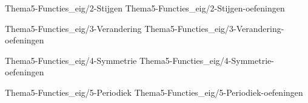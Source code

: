   \FVDchapterpair
  {Thema5-Functies_eig/2-Stijgen}
  {Thema5-Functies_eig/2-Stijgen-oefeningen}
  
  \FVDchapterpair
  {Thema5-Functies_eig/3-Verandering}
  {Thema5-Functies_eig/3-Verandering-oefeningen}
  
  \FVDchapterpair
  {Thema5-Functies_eig/4-Symmetrie}
  {Thema5-Functies_eig/4-Symmetrie-oefeningen}
  
  \FVDchapterpair
  {Thema5-Functies_eig/5-Periodiek}
  {Thema5-Functies_eig/5-Periodiek-oefeningen}    

  
  
  
  
  
  
